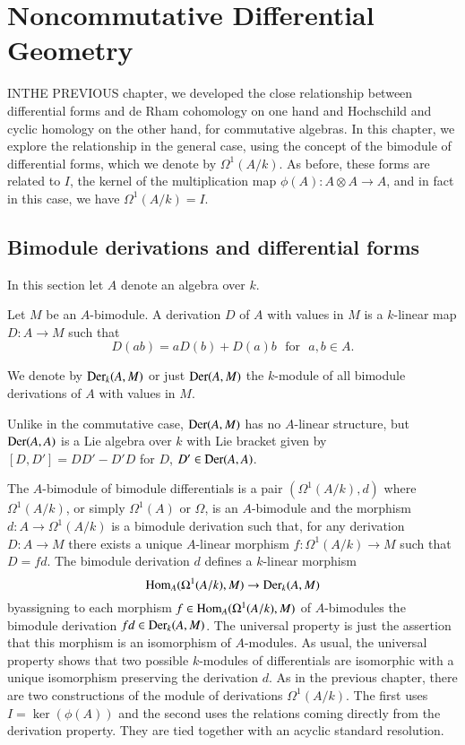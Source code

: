 \chapter{Noncommutative Differential Geometry}\label{chap7}

IN\pageoriginale THE PREVIOUS chapter, we developed the close
relationship between differential forms and de Rham cohomology on one
hand and Hochschild and cyclic homology on the other hand, for
commutative algebras. In this chapter, we explore the relationship in
the general case, using the concept of the bimodule of
differential
forms, which we denote by $\Omega^{1}(A/k)$. As before, these forms
are related to $I$, the kernel of the multiplication map
$\phi(A):A\otimes A\to A$, and in fact in this case, we have
$\Omega^{1}(A/k)=I$. 

\section{Bimodule derivations and differential
  forms}\label{chap7-sec1}

In this section let $A$ denote an algebra over $k$.

\begin{definition}\label{chap7-defi1.1}
Let $M$ be an $A$-bimodule. A derivation $D$ of $A$ with values in $M$
is a $k$-linear map $D:A\to M$ such that
$$
D(ab)=aD(b)+D(a)b\text{~ for~ } a,b\in A.
$$

We denote by $\operatorname{Der}_{k}(A,M)$ or just $\operatorname{Der}(A,M)$ the $k$-module of all
bimodule derivations of $A$ with values in $M$.
\end{definition}

Unlike in the commutative case, $\operatorname{Der}(A,M)$ has no $A$-linear
structure, but $\operatorname{Der}(A,A)$ is a Lie algebra over $k$ with Lie bracket
given by $[D,D']=DD'-D'D$ for $D$, $D'\in \operatorname{Der}(A,A)$.

\begin{definition}\label{chap7-defi1.2}
The $A$-bimodule of bimodule differentials is a pair\break 
$(\Omega^{1}(A/k),d)$ where $\Omega^{1}(A/k)$, or simply
$\Omega^{1}(A)$ or $\Omega$, is an $A$-bimodule and the morphism
$d:A\to \Omega^{1}(A/k)$ is a bimodule derivation such that, for any
derivation $D:A\to M$ there exists a unique $A$-linear morphism
$f:\Omega^{1}(A/k)\to M$ such that $D=fd$. The bimodule derivation $d$
defines a $k$-linear morphism
$$
\operatorname{Hom}_{A}(\Omega^{1}(A/k),M)\to \operatorname{Der}_{k}(A,M)
$$
by\pageoriginale assigning to each morphism $f\in
\operatorname{Hom}_{A}(\Omega^{1}(A/k),M)$ of $A$-bimodules the bimodule derivation
$fd\in \operatorname{Der}_{k}(A,M)$. The universal property is just the assertion
that this morphism is an isomorphism of $A$-modules. As usual, the
universal property shows that two possible $k$-modules of
differentials are isomorphic with a unique isomorphism preserving the
derivation $d$. As in the previous chapter, there are two
constructions of the module of derivations $\Omega^{1}(A/k)$. The
first uses $I=\ker(\phi(A))$ and the second uses the relations coming
directly from the derivation property. They are tied together with an
acyclic standard resolution.
\end{definition}

